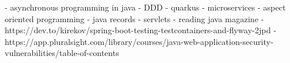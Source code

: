 

- asynchronous programming in java
- DDD
- quarkus
- microservices
- aspect oriented programming
- java records
- servlets
- reading java magazine
- https://dev.to/kirekov/spring-boot-testing-testcontainers-and-flyway-2jpd
- https://app.pluralsight.com/library/courses/java-web-application-security-vulnerabilities/table-of-contents